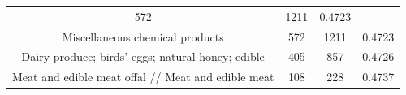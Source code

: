 \documentclass[10pt,]{article}
\begin{document}
\begin{longtable}[]{@{}cccc@{}}
\begin{minipage}[t]{0.21\columnwidth}
572\strut
\end{minipage} & \begin{minipage}[t]{0.20\columnwidth}\centering\strut
1211\strut
\end{minipage} & \begin{minipage}[t]{0.09\columnwidth}\centering\strut
0.4723\strut
\end{minipage}\tabularnewline
\begin{minipage}[t]{0.38\columnwidth}\centering\strut
Miscellaneous chemical products\strut
\end{minipage} & \begin{minipage}[t]{0.21\columnwidth}\centering\strut
572\strut
\end{minipage} & \begin{minipage}[t]{0.20\columnwidth}\centering\strut
1211\strut
\end{minipage} & \begin{minipage}[t]{0.09\columnwidth}\centering\strut
0.4723\strut
\end{minipage}\tabularnewline
\begin{minipage}[t]{0.38\columnwidth}\centering\strut
Dairy produce; birds' eggs; natural honey; edible\strut
\end{minipage} & \begin{minipage}[t]{0.21\columnwidth}\centering\strut
405\strut
\end{minipage} & \begin{minipage}[t]{0.20\columnwidth}\centering\strut
857\strut
\end{minipage} & \begin{minipage}[t]{0.09\columnwidth}\centering\strut
0.4726\strut
\end{minipage}\tabularnewline
\begin{minipage}[t]{0.38\columnwidth}\centering\strut
Meat and edible meat offal // Meat and edible meat\strut
\end{minipage} & \begin{minipage}[t]{0.21\columnwidth}\centering\strut
108\strut
\end{minipage} & \begin{minipage}[t]{0.20\columnwidth}\centering\strut
228\strut
\end{minipage} & \begin{minipage}[t]{0.09\columnwidth}\centering\strut
0.4737\strut
\end{minipage}\tabularnewline
\bottomrule
\end{longtable}
\end{document}
